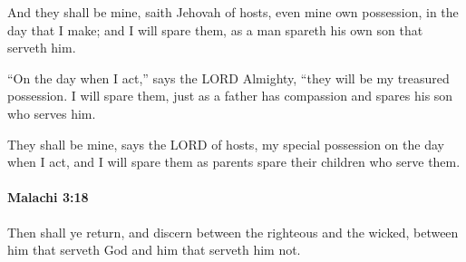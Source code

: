 			\begin{versebox}
					\item[BHS] 
					\item[LXX] 
					\item[ASV] And they shall be mine, saith Jehovah of hosts, even mine own possession, in the day that I make; and I will spare them, as a man spareth his own son that serveth him.
					\item[NIV] “On the day when I act,” says the LORD Almighty, “they will be my treasured possession. I will spare them, just as a father has compassion and spares his son who serves him.
					\item[NRSV] They shall be mine, says the LORD of hosts, my special possession on the day when I act, and I will spare them as parents spare their children who serve them.
			\end{versebox}

		\paragraph{Malachi 3:18} %
			\label{MALACHI-3-18}

			Then shall ye return, and discern between the righteous and the wicked, between him that serveth God and him that serveth him not.

